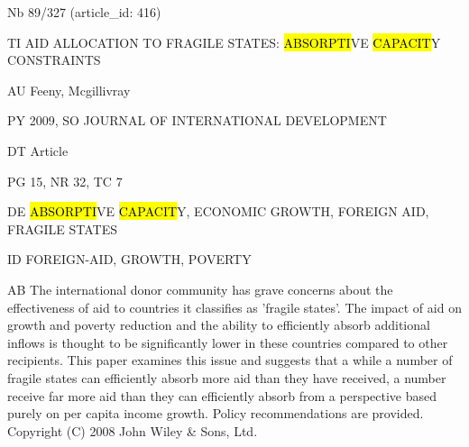 \documentclass[a4paper]{article}
\begin{document}
\vspace*{-2cm}
Nb \tabto{0cm}89/327 (article\_id: 416)\par
TI \tabto{0cm}AID ALLOCATION TO FRAGILE STATES: \hl{ABSORPTI}VE \hl{CAPACIT}Y CONSTRAINTS\par
AU \tabto{0cm}Feeny, Mcgillivray\par
PY \tabto{0cm}2009, SO JOURNAL OF INTERNATIONAL DEVELOPMENT\par
DT \tabto{0cm}Article\par
PG \tabto{0cm}15, NR 32, TC 7\par
DE \tabto{0cm}\hl{ABSORPTI}VE \hl{CAPACIT}Y, ECONOMIC GROWTH, FOREIGN AID, FRAGILE STATES\par
ID \tabto{0cm}FOREIGN-AID, GROWTH, POVERTY\par
AB \tabto{0cm}The international donor community has grave concerns about the effectiveness of aid to countries it classifies as 'fragile states'. The impact of aid on growth and poverty reduction and the ability to efficiently absorb additional inflows is thought to be significantly lower in these countries compared to other recipients. This paper examines this issue and suggests that a while a number of fragile states can efficiently absorb more aid than they have received, a number receive far more aid than they can efficiently absorb from a perspective based purely on per capita income growth. Policy recommendations are provided. Copyright (C) 2008 John Wiley \& Sons, Ltd.\par
\clearpage
\end{document}
